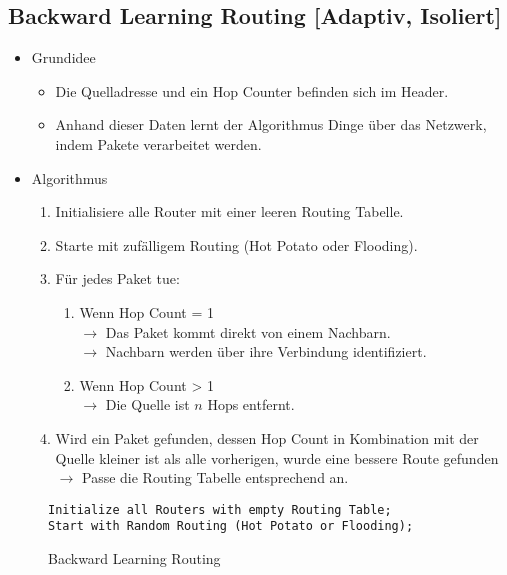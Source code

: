 		\subsection{Backward Learning Routing [Adaptiv, Isoliert]}
			\begin{itemize}
				\item Grundidee
					\begin{itemize}
						\item Die Quelladresse und ein Hop Counter befinden sich im Header.
						\item Anhand dieser Daten lernt der Algorithmus Dinge über das Netzwerk, indem Pakete verarbeitet werden.
					\end{itemize}
				\item Algorithmus
					\begin{enumerate}
						\item Initialisiere alle Router mit einer leeren Routing Tabelle.
						\item Starte mit zufälligem Routing (Hot Potato oder Flooding).
						\item Für jedes Paket tue:
							\begin{enumerate}
								\item Wenn Hop Count = 1
									\\ \(\rightarrow\) Das Paket kommt direkt von einem Nachbarn.
									\\ \(\rightarrow\) Nachbarn werden über ihre Verbindung identifiziert.
								\item Wenn Hop Count > 1
									\\ \(\rightarrow\) Die Quelle ist \(n\) Hops entfernt.
							\end{enumerate}
						\item Wird ein Paket gefunden, dessen Hop Count in Kombination mit der Quelle kleiner ist als alle vorherigen, wurde eine bessere Route gefunden
							\\ \(\rightarrow\) Passe die Routing Tabelle entsprechend an.
					\end{enumerate}
			\end{itemize}
			\begin{figure}[H]
				\centering
				\begin{lstlisting}
Initialize all Routers with empty Routing Table;
Start with Random Routing (Hot Potato or Flooding);
            	\end{lstlisting}
				\caption{Backward Learning Routing}
			\end{figure}


